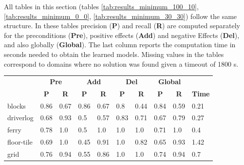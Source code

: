 All tables in this section (tables \ref{tab:results_minimum_100_10}, \ref{tab:results_minimum_0_0}, \ref{tab:results_minimum_30_30}) follow the same structure. In these tables precision ({\bf P}) and recall ({\bf R}) are computed separately for the preconditions ({\bf Pre}), positive effects ({\bf Add}) and negative Effects ({\bf Del}), and also globally ({\bf Global}). The last column reports the computation time in seconds needed to obtain the learned models. Missing values in the tables correspond to domains where no solution was found given a timeout of 1800 s.

\begin{table}[hbt!]
		\begin{center}
			
			\begin{tabular}{l|l|l|l|l|l|l||l|l|l|}
				& \multicolumn{2}{|c|}{\bf Pre} & \multicolumn{2}{|c|}{\bf Add} & \multicolumn{2}{|c||}{\bf Del} & \multicolumn{2}{|c|}{\bf Global} & \\ \cline{2-9}			
				& \multicolumn{1}{|c|}{\bf P} & \multicolumn{1}{|c|}{\bf R} & \multicolumn{1}{|c|}{\bf P} & \multicolumn{1}{|c|}{\bf R} & \multicolumn{1}{|c|}{\bf P} & \multicolumn{1}{|c||}{\bf R} &  \multicolumn{1}{|c|}{\bf P} & \multicolumn{1}{|c|}{\bf R} & {\bf Time} \\
				\hline
				blocks & 0.86 & 0.67 & 0.86 & 0.67 & 0.8 & 0.44 & 0.84 & 0.59& 0.21 \\ %
				driverlog & 0.68 & 0.93 & 0.5 & 0.57 & 0.83 & 0.71 & 0.67 & 0.79& 0.27 \\ %
				ferry & 0.78 & 1.0 & 0.5 & 1.0 & 1.0 & 1.0 & 0.71 & 1.0& 0.4 \\ %
				floor-tile & 0.69 & 1.0 & 0.45 & 0.91 & 1.0 & 0.82 & 0.65 & 0.93& 1.42 \\ %
				grid & 0.76 & 0.94 & 0.55 & 0.86 & 1.0 & 1.0 & 0.74 & 0.94& 0.7 \\ %

\end{tabular}
\end{center}
\end{table}
